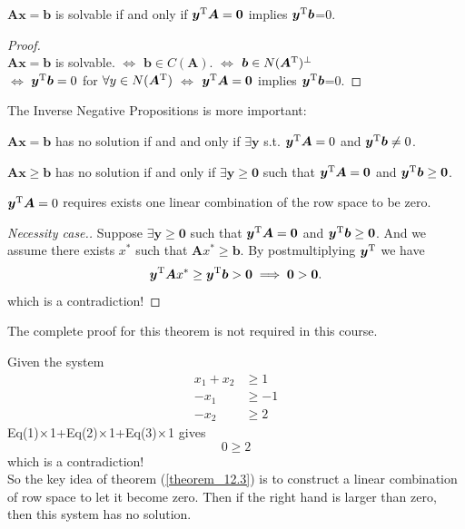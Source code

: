 \newpage
\begin{corollary}
$\bm{Ax}=\bm b$ is solvable if and only if $\bm y^{\mathrm T}\bm A=\bm 0$ implies $\bm y^{\mathrm T}\bm b$=0.
\end{corollary}
\begin{proof}\qquad\\
$\bm{Ax}=\bm b$ is solvable.
$\Longleftrightarrow$
$\bm b\in C(\bm A)$.
$\Longleftrightarrow$
$\bm b\in N(\bm A^{\mathrm T})^{\perp}$\\
$\Longleftrightarrow$
$\bm y^{\mathrm T}\bm b=0$ for $\forall y\in N(\bm A^{\mathrm T})$
$\Longleftrightarrow$
$\bm y^{\mathrm T}\bm A=\bm 0$ implies $\bm y^{\mathrm T}\bm b$=0.
\end{proof}
The Inverse Negative Propositions is more important:
\begin{corollary}
$\bm{Ax}=\bm b$ has no solution if and  and only if $\exists \bm y$ s.t. $\bm y^{\mathrm T}\bm A=0$ and $\bm y^{\mathrm T}\bm b\ne 0$.
\end{corollary}
\begin{remark}
\begin{theorem}\label{theorem_12.3}
$\bm{Ax}\ge\bm b$ has no solution if and only if $\exists \bm y\ge\bm 0$ such that $\bm y^{\mathrm T}\bm A=\bm 0$ and $\bm y^{\mathrm T}\bm b\ge \bm 0$.
\end{theorem}
$\bm y^{\mathrm T}\bm A=0$ requires exists one linear combination of the row space to be zero.
\begin{proof}[Necessity case.]
Suppose $\exists \bm y\ge\bm 0$ such that $\bm y^{\mathrm T}\bm A=\bm 0$ and $\bm y^{\mathrm T}\bm b\ge \bm 0$. And we assume there exists $x^{*}$ such that $\bm Ax^{*}\ge\bm b$. By postmultiplying $\bm y^{\mathrm T}$ we have 
\[\bm y^{\mathrm T}\bm Ax^{*}\ge\bm y^{\mathrm T}\bm b>\bm 0
\implies 
\bm 0>\bm 0.
\]
which is a contradiction!
\end{proof}
The complete proof for this theorem is not required in this course.
\end{remark}
\begin{example}
Given the system 
\begin{equation}
\begin{aligned}
x_1+x_2&\ge1\\
-x_1&\ge-1\\
-x_2&\ge2
\end{aligned}
\end{equation}
Eq(1)$\times$1+Eq(2)$\times$1+Eq(3)$\times$1 gives
\[
0\ge 2
\]
which is a contradiction!\\
So the key idea of theorem (\ref{theorem_12.3}) is to construct a linear combination of row space to let it become zero. Then if the right hand is larger than zero, then this system has no solution.
\end{example}
